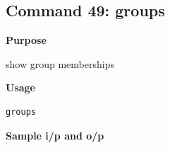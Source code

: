 \subsection{Command 49: groups} 
\textbf{Purpose}
\begin{flushleft}
 show group memberships
\end{flushleft}
\textbf{Usage}
\begin{verbatim}
groups
\end{verbatim}
\textbf{Sample i/p and o/p}
\begin{figure}[H] 
\end{figure}

